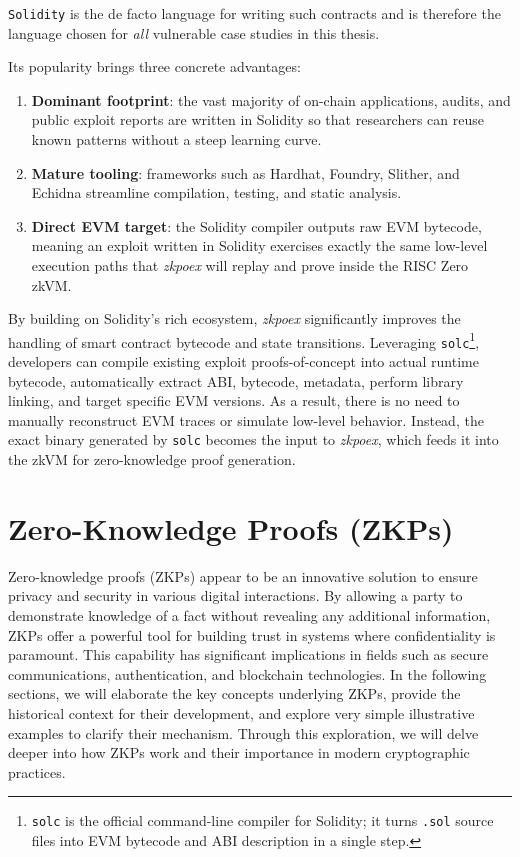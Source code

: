 \texttt{Solidity} is the de facto language for writing such contracts and is therefore the language chosen for \textit{all} vulnerable case studies in this thesis.  

Its popularity brings three concrete advantages:
\begin{enumerate}
    \item \textbf{Dominant footprint}: the vast majority of on-chain applications, audits, and public exploit reports are written in Solidity so that researchers can reuse known patterns without a steep learning curve.
    \item \textbf{Mature tooling}: frameworks such as Hardhat, Foundry, Slither, and Echidna streamline compilation, testing, and static analysis.
    \item \textbf{Direct EVM target}: the Solidity compiler outputs raw EVM bytecode, meaning an exploit written in Solidity exercises exactly the same low-level execution paths that \textit{zkpoex} will replay and prove inside the RISC Zero zkVM.
\end{enumerate}

By building on Solidity’s rich ecosystem, \textit{zkpoex} significantly improves the handling of smart contract bytecode and state transitions. Leveraging \texttt{solc}\footnote{\texttt{solc} is the official command-line compiler for Solidity; it turns \texttt{.sol} source files into EVM bytecode and ABI description in a single step.}, developers can compile existing exploit proofs-of-concept into actual runtime bytecode, automatically extract ABI, bytecode, metadata, perform library linking, and target specific EVM versions. As a result, there is no need to manually reconstruct EVM traces or simulate low-level behavior. Instead, the exact binary generated by \texttt{solc} becomes the input to \textit{zkpoex}, which feeds it into the zkVM for zero-knowledge proof generation.


\section{Zero-Knowledge Proofs (ZKPs)}\label{zkpChap}
Zero-knowledge proofs (ZKPs) appear to be an innovative solution to ensure privacy and security in various digital interactions. By allowing a party to demonstrate knowledge of a fact without revealing any additional information, ZKPs offer a powerful tool for building trust in systems where confidentiality is paramount. This capability has significant implications in fields such as secure communications, authentication, and blockchain technologies. In the following sections, we will elaborate the key concepts underlying ZKPs, provide the historical context for their development, and explore very simple illustrative examples to clarify their mechanism. Through this exploration, we will delve deeper into how ZKPs work and their importance in modern cryptographic practices.

